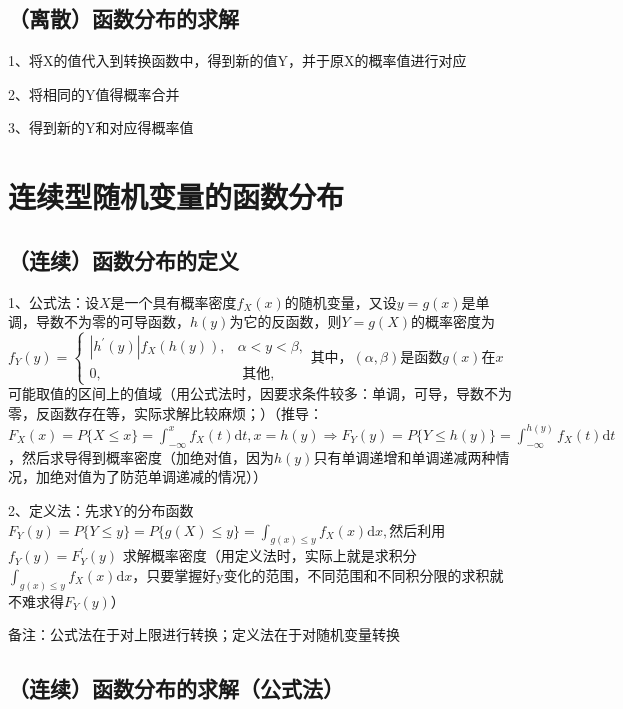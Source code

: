 \subsection{（离散）函数分布的求解}

1、将X的值代入到转换函数中，得到新的值Y，并于原X的概率值进行对应

2、将相同的Y值得概率合并

3、得到新的Y和对应得概率值

\section{连续型随机变量的函数分布}



\subsection{（连续）函数分布的定义}

1、公式法：设$X$是一个具有概率密度$f_X(x)$的随机变量，又设$y=g(x)$是单调，导数不为零的可导函数，$h(y)$为它的反函数，则$Y=g(X)$的概率密度为$f_{Y}(y)=\left\{\begin{array}{cc}\left|h^{\prime}(y)\right| f_{X}(h(y)), & \alpha<y<\beta, \\0, & \text { 其他, }\end{array}\right.$其中，$(\alpha,\beta)$是函数$g(x)$在$x$可能取值的区间上的值域（用公式法时，因要求条件较多：单调，可导，导数不为零，反函数存在等，实际求解比较麻烦；）（推导：$F_{X}(x)=P\{X \leqslant x\}=\int_{-\infty}^{x} f_{X}(t) \mathrm{d} t, x=h(y) \Rightarrow F_{Y}(y)=P\{Y \leqslant h(y)\}=\int_{-\infty}^{h(y)} f_{X}(t) \mathrm{d} t$，然后求导得到概率密度（加绝对值，因为$h(y)$只有单调递增和单调递减两种情况，加绝对值为了防范单调递减的情况））

2、定义法：先求Y的分布函数$F_{Y}(y)=P\{Y \leqslant y\}=P\{g(X) \leqslant y\}=\int_{g(x) \leqslant y} f_{X}(x) \mathrm{d} x, $然后利用$f_{Y}(y)=F_{Y}^{\prime}(y)$ 求解概率密度（用定义法时，实际上就是求积分$\int_{g(x) \leqslant y} f_{X}(x) \mathrm{d} x$，只要掌握好y变化的范围，不同范围和不同积分限的求积就不难求得$F_Y(y)$）

备注：公式法在于对上限进行转换；定义法在于对随机变量转换



\subsection{（连续）函数分布的求解（公式法）}

